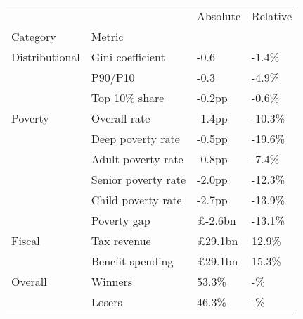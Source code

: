 \begin{tabular}{llll}
\toprule
        &        & Absolute & Relative \\
Category & Metric &          &          \\
\midrule
Distributional & Gini coefficient &     -0.6 &    -1.4\% \\
        & P90/P10 &     -0.3 &    -4.9\% \\
        & Top 10\% share &   -0.2pp &    -0.6\% \\
Poverty & Overall rate &   -1.4pp &   -10.3\% \\
        & Deep poverty rate &   -0.5pp &   -19.6\% \\
        & Adult poverty rate &   -0.8pp &    -7.4\% \\
        & Senior poverty rate &   -2.0pp &   -12.3\% \\
        & Child poverty rate &   -2.7pp &   -13.9\% \\
        & Poverty gap &  £-2.6bn &   -13.1\% \\
Fiscal & Tax revenue &  £29.1bn &    12.9\% \\
        & Benefit spending &  £29.1bn &    15.3\% \\
Overall & Winners &    53.3\% &       -\% \\
        & Losers &    46.3\% &       -\% \\
\bottomrule
\end{tabular}
